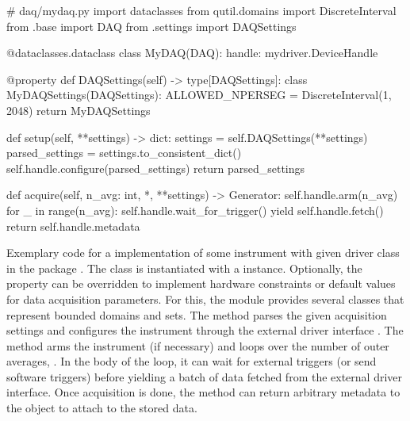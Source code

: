 \begin{listing}
    \begin{py}
# daq/mydaq.py
import dataclasses
from qutil.domains import DiscreteInterval
from .base import DAQ
from .settings import DAQSettings

@dataclasses.dataclass
class MyDAQ(DAQ):
    handle: mydriver.DeviceHandle

    @property
    def DAQSettings(self) -> type[DAQSettings]:
        class MyDAQSettings(DAQSettings):
            ALLOWED_NPERSEG = DiscreteInterval(1, 2048)
        return MyDAQSettings

    def setup(self, **settings) -> dict:
        settings = self.DAQSettings(**settings)
        parsed_settings = settings.to_consistent_dict()
        self.handle.configure(parsed_settings)
        return parsed_settings

    def acquire(self, n_avg: int, *, **settings) -> Generator:
        self.handle.arm(n_avg)
        for _ in range(n_avg):
            self.handle.wait_for_trigger()
            yield self.handle.fetch()
        return self.handle.metadata
    \end{py}
    \caption[ pseudocode]{
        Exemplary code for a  implementation of some instrument with given driver class  in the package .
        The  class is instantiated with a  instance.
        Optionally, the  property can be overridden to implement hardware constraints or default values for data acquisition parameters.
        For this, the  module provides several classes that represent bounded domains and sets.
        The  method parses the given acquisition settings and configures the instrument through the external driver interface .
        The  method arms the instrument (if necessary) and loops over the number of outer averages, .
        In the body of the loop, it can wait for external triggers (or send software triggers) before yielding a batch of data fetched from the external driver interface.
        Once acquisition is done, the method can return arbitrary metadata to the  object to attach to the stored data.
    }
    \label{lst:speck:daq_pseudocode}
\end{listing}

